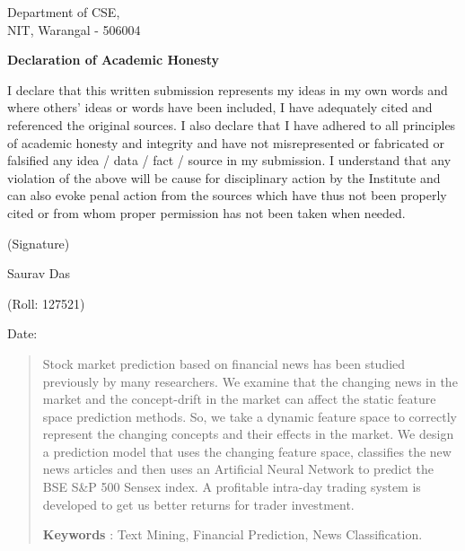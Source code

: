 \documentclass[a4paper,12bp]{report}
\begin{document}
\large {
\begin{flushleft}
Department of CSE,\\
NIT, Warangal - 506004
\end{flushleft}
\begin{center}
\LARGE{\textbf{Declaration of Academic Honesty}}
\end{center}
\Large
I declare that this written submission represents my ideas in my own words and where others' ideas or words have been included, I have adequately cited and referenced the original sources. I also declare that I have adhered to all principles of academic honesty and integrity and have not misrepresented or fabricated or falsified any idea / data / fact / source in my submission. I understand that any violation of the above will be cause for disciplinary action by the Institute and can also evoke penal action from the sources which have thus not been properly cited or from whom proper permission has not been taken when needed.
\vspace{2cm}

\underline{\hspace{6cm}}

(Signature)

\vspace{2.5mm}
Saurav Das

\vspace{2.5mm}
(Roll: 127521)

\vspace{2.5mm}
Date: \underline{\hspace{6cm}}
}


\begin{doublespacing}

\begin{abstract}
\setcounter{page}{4}
Stock market prediction based on financial news has been studied previously by many researchers. We examine that the changing news in the market and the concept-drift in the market can affect the static feature space prediction methods. So, we take a dynamic feature space to correctly represent the changing concepts and their effects in the market. We design a prediction model that uses the changing feature space, classifies the new news articles and then uses an Artificial Neural Network to predict the BSE S\&P 500 Sensex index. A profitable intra-day trading system is developed to get us better returns for trader investment. 

\textbf{Keywords} : Text Mining, Financial Prediction, News Classification.
\end{abstract}
\end{doublespacing}
\newpage
\setcounter{page}{5}
\setlength{\cftbeforechapskip}{1em}
\setlength{\cftbeforesecskip}{0.5em}
\setlength{\cftbeforesubsecskip}{0.5em}
\setlength{\cftbeforefigskip}{0.5em}
\setlength{\cftbeforetabskip}{0.5em}
\renewcommand{\cfttoctitlefont}{\LARGE\bfseries}
\renewcommand{\cftloftitlefont}{\LARGE\bfseries}
\renewcommand{\cftlottitlefont}{\LARGE\bfseries}
\end{document}
